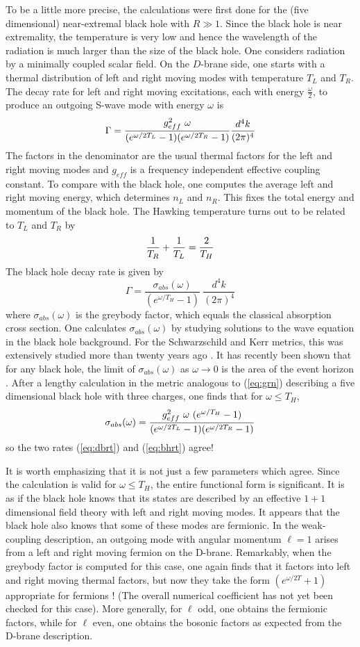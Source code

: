 \documentclass[12pt]{article}
\newcommand{\eq}{\begin{equation}}
\newcommand{\eqe}{\end{equation}}
\newcommand{\e}[1]{\label{eq:#1}}
\newcommand{\ee}[1]{(\ref{eq:#1})}
\begin{document}
To be a little more precise, the calculations were first done
for the (five dimensional)
near-extremal black hole with $R\gg 1$. Since the black hole is near
extremality, the temperature is very low and hence the wavelength of the
radiation is much larger than the size of the black hole.  One considers
radiation by a  minimally coupled scalar field.  On the $D$-brane side,
one starts with a thermal distribution of left and right moving modes
with temperature $T_L$ and $T_R$.  The decay rate for  
left and right moving
excitations, each  with energy $\frac{\omega}{2}$, to produce an
outgoing S-wave mode with energy $\omega$ is 
\eq\e{dbrt}
\Gamma ={g^2_{eff}\ \omega\over (e^{\omega/2T_L} -1)(e^{\omega/2T_R} -1)} 
{d^4 k\over
(2\pi)^4}
\eqe
The factors in the denominator are the usual thermal factors for the 
left and right moving modes and $g_{eff}$ is a frequency independent 
effective coupling constant. To compare with the black hole, one computes
the average left and right moving energy,  which determines $n_L$ and
$n_R$. This fixes the total energy and momentum of the black hole. 
The Hawking temperature
turns out to be related to $T_L$ and $T_R$ by
\eq
{1\over T_R} + {1\over T_L} = {2\over T_H}
\eqe
The black hole decay rate is given by \cite{haw}
\eq\e{bhrt}
\Gamma = \frac{\sigma_{abs}(\omega)}{(e^{\omega/T_H}-1)}
\ \frac{d^4k}{(2\pi)^4}
\eqe
where $\sigma_{abs}(\omega)$ is the greybody factor, which equals
the classical absorption cross section. One calculates
$\sigma_{abs}(\omega)$ by studying solutions to the wave equation in the
black hole background.  For the Schwarzschild and Kerr metrics, this was
extensively studied more than twenty years ago \cite{stch}.
It has recently been shown that for any black hole, the limit
of $\sigma_{abs}(\omega)$ as $\omega\rightarrow 0$ is the area of the event
horizon \cite{dgm}.   After a lengthy calculation in the metric analogous to
\ee{grn} describing a five dimensional black hole with three charges,
one finds \cite{mast2} that for 
$\omega \leq T_H$,
\eq
\sigma_{abs}(\omega)  
= {g_{eff}^2 \ \omega\ (e^{\omega/T_H}-1) \over (e^{\omega/2T_L}-1)
(e^{\omega/2T_R}-1)}
\eqe
so  the two rates \ee{dbrt} and \ee{bhrt}
agree!

It is worth emphasizing that it is not just a few parameters which agree.
Since the calculation is valid for $\omega \leq T_H$, the entire
functional form is significant.  It is as if the black hole 
knows that its states are described by an effective $1+1$ dimensional
field theory with left and right moving modes. It
appears that the black hole also knows that some of these modes are
fermionic. 
In the weak-coupling description, an outgoing mode with angular momentum
$\ell=1$ arises from a left and right moving fermion on the
D-brane. Remarkably, when the greybody factor is computed for this
case, one again finds that it factors into  left and right moving
thermal factors, but now they take the form $(e^{\omega/2T}+1)$ appropriate for
fermions \cite{mast3}! (The overall numerical coefficient has not yet
been checked
for this case).  More generally, for $\ell$ odd, one obtains the
fermionic factors, while for $\ell$ even, one obtains the bosonic factors
as expected from the D-brane description.
\end{document}
